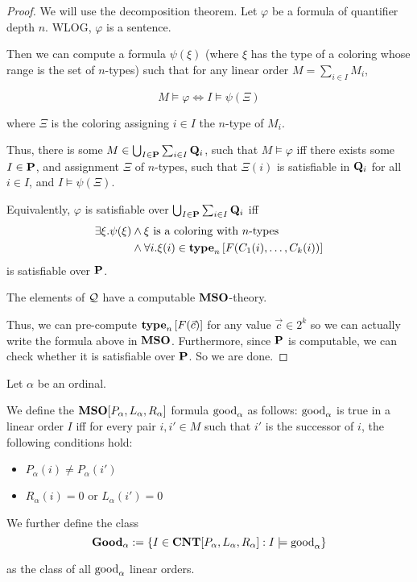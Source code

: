 \begin{proof}
  We will use the decomposition theorem.
  Let $\varphi$ be a formula of quantifier depth $n$. WLOG, $\varphi$ is a sentence.

  Then we can compute a formula $\psi(\xi)$ (where
  $\xi$ has the type of a coloring whose range is
  the set of $n$-types) such that
  for any linear order $M = \sum_{i \in I} M_i$,

  \[
    M \models \varphi \iff I \models \psi(\Xi)
  \]

  where $\Xi$ is the coloring assigning $i \in I$ the $n$-type of $M_i$.

  Thus, there is some $M \in \bigcup_{I \in \mathbf{P}} \sum_{i \in I} \mathbf{Q}_i$,
  such that $M \models \varphi$
  iff there exists some $I \in \mathbf{P}$, and assignment $\Xi$ of $n$-types,
  such that $\Xi(i)$ is satisfiable in $\mathbf{Q}_i$ for all $i \in I$, and $I \models \psi(\Xi)$.

  Equivalently, $\varphi$ is satisfiable over $\bigcup_{I \in \mathbf{P}} \sum_{i \in I} \mathbf{Q}_i$
  iff
  \begin{align*}
    \exists \xi. \psi(\xi)
     & \wedge \xi \text{ is a coloring with }n\text{-types}             \\
     & \wedge \forall i. \xi(i) \in \mathbf{type}_{n} \left[ {F(C_1(i), \ldots, C_k(i))} \right]
  \end{align*}
  is satisfiable over $\mathbf{P}$.

  The elements of $\mathcal{Q}$ have a computable $\mathbf{MSO}$-theory.

  Thus, we can pre-compute $\mathbf{type}_{n} \left[ {F(\vec{c})} \right]$
  for any value $\vec{c} \in 2^k$ so we can actually write the formula above in
  $\mathbf{MSO}$. Furthermore, since $\mathbf{P}$ is computable, we can check whether it is satisfiable
  over $\mathbf{P}$. So we are done.
\end{proof}

\begin{definition}
  Let $\alpha$ be an ordinal.

  We define the $\mathbf{MSO}[P_\alpha, L_\alpha, R_\alpha]$ formula $\mathrm{good}_{\alpha}$ as follows:
  $\mathrm{good}_{\alpha}$ is true in a linear order $I$ iff
  for every pair $i, i' \in M$ such that $i'$ is the successor of $i$, the following conditions hold:
  \begin{itemize}
    \item $P_\alpha(i) \ne P_\alpha(i')$
    \item $R_\alpha(i) = 0$ or $L_\alpha(i') = 0$
  \end{itemize}

  We further define the class
  \[
    \mathbf{Good}_{\alpha} := \left\{ {I \in \mathbf{CNT} [P_\alpha, L_\alpha, R_\alpha] : I \models \mathrm{good}_{\alpha}} \right\}
  \]

  as the class of all $\mathrm{good}_{\alpha}$ linear orders.
\end{definition}

